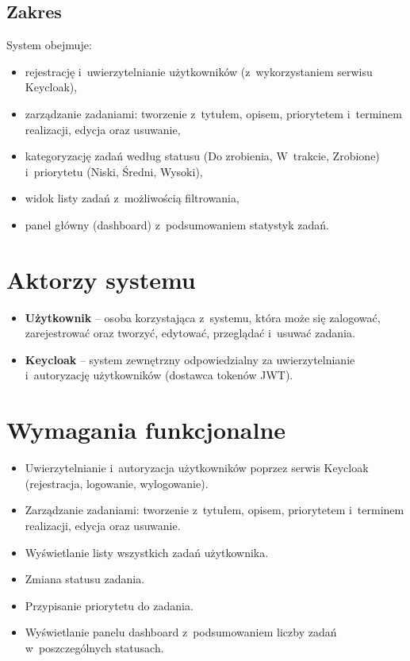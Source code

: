 \documentclass[12pt, a4paper, oneside]{article}
\begin{document}
\subsection{Zakres}
System obejmuje:
\begin{itemize}
  \item rejestrację i~uwierzytelnianie użytkowników (z~wykorzystaniem serwisu Keycloak),
  \item zarządzanie zadaniami: tworzenie z~tytułem, opisem, priorytetem i~terminem realizacji, edycja oraz usuwanie,
  \item kategoryzację zadań według statusu (Do zrobienia, W~trakcie, Zrobione) i~priorytetu (Niski, Średni, Wysoki),
  \item widok listy zadań z~możliwością filtrowania,
  \item panel główny (dashboard) z~podsumowaniem statystyk zadań.
\end{itemize}

\section{Aktorzy systemu}

\begin{itemize}
  \item \textbf{Użytkownik} -- osoba korzystająca z~systemu, która może się zalogować, zarejestrować oraz tworzyć, edytować, przeglądać i~usuwać zadania.
  \item \textbf{Keycloak} -- system zewnętrzny odpowiedzialny za uwierzytelnianie i~autoryzację użytkowników (dostawca tokenów JWT).
\end{itemize}

\section{Wymagania funkcjonalne}

\begin{itemize}
  \item Uwierzytelnianie i~autoryzacja użytkowników poprzez serwis Keycloak (rejestracja, logowanie, wylogowanie).
  \item Zarządzanie zadaniami: tworzenie z~tytułem, opisem, priorytetem i~terminem realizacji, edycja oraz usuwanie.
  \item Wyświetlanie listy wszystkich zadań użytkownika.
  \item Zmiana statusu zadania.
  \item Przypisanie priorytetu do zadania.
  \item Wyświetlanie panelu dashboard z~podsumowaniem liczby zadań w~poszczególnych statusach.
\end{itemize}
\end{document}
